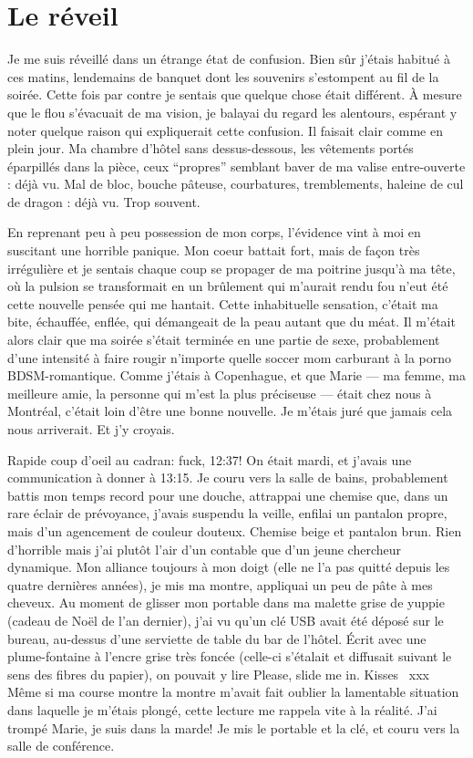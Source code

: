 \chapter{Le réveil}

Je me suis réveillé dans un étrange état de confusion. Bien sûr
j'étais habitué à ces matins, lendemains de banquet dont les souvenirs
s'estompent au fil de la soirée. Cette fois par contre je sentais que
quelque chose était différent. À mesure que le flou s'évacuait de ma
vision, je balayai du regard les alentours, espérant y noter quelque
raison qui expliquerait cette confusion. Il faisait clair comme en
plein jour. Ma chambre d'hôtel sans dessus-dessous, les vêtements
portés éparpillés dans la pièce, ceux ``propres'' semblant baver de ma
valise entre-ouverte : déjà vu. Mal de bloc, bouche pâteuse,
courbatures, tremblements, haleine de cul de dragon : déjà vu. Trop
souvent.

En reprenant peu à peu possession de mon corps, l'évidence vint à moi
en suscitant une horrible panique. Mon coeur battait fort, mais de
façon très irrégulière et je sentais chaque coup se propager de ma
poitrine jusqu'à ma tête, où la pulsion se transformait en un
brûlement qui m'aurait rendu fou n'eut été cette nouvelle pensée qui
me hantait. Cette inhabituelle sensation, c'était ma bite, échauffée,
enflée, qui démangeait de la peau autant que du méat. Il m'était alors
clair que ma soirée s'était terminée en une partie de sexe,
probablement d'une intensité à faire rougir n'importe quelle soccer
mom carburant à la porno BDSM-romantique. Comme j'étais à Copenhague,
et que Marie — ma femme, ma meilleure amie, la personne qui m'est la
plus préciseuse — était chez nous à Montréal, c'était loin d'être une
bonne nouvelle. Je m'étais juré que jamais cela nous arriverait. Et
j'y croyais.

Rapide coup d'oeil au cadran: fuck, 12:37! On était mardi, et j'avais une communication à donner à 13:15. Je couru vers la salle de bains, probablement battis mon temps record pour une douche, attrappai une chemise que, dans un rare éclair de prévoyance, j'avais suspendu la veille, enfilai un pantalon propre, mais d'un agencement de couleur douteux. Chemise beige et pantalon brun. Rien d'horrible mais j'ai plutôt l'air d'un contable que d'un jeune chercheur dynamique. Mon alliance toujours à mon doigt (elle ne l'a pas quitté depuis les quatre dernières années), je mis ma montre, appliquai un peu de pâte à mes cheveux. Au moment de glisser mon portable dans ma malette grise de yuppie (cadeau de Noël de l'an dernier), j'ai vu qu'un clé USB  avait été déposé sur le bureau, au-dessus d'une serviette de table du bar de l'hôtel. Écrit avec une plume-fontaine à l'encre grise très foncée (celle-ci s'étalait et diffusait suivant le sens des fibres du papier), on pouvait y lire Please, slide me in. Kisses ~xxx~ Même si ma course montre la montre m'avait fait oublier la lamentable situation dans laquelle je m'étais plongé, cette lecture me rappela vite à la réalité. J'ai trompé Marie, je suis dans la marde! Je mis le portable et la clé, et couru vers la salle de conférence.



